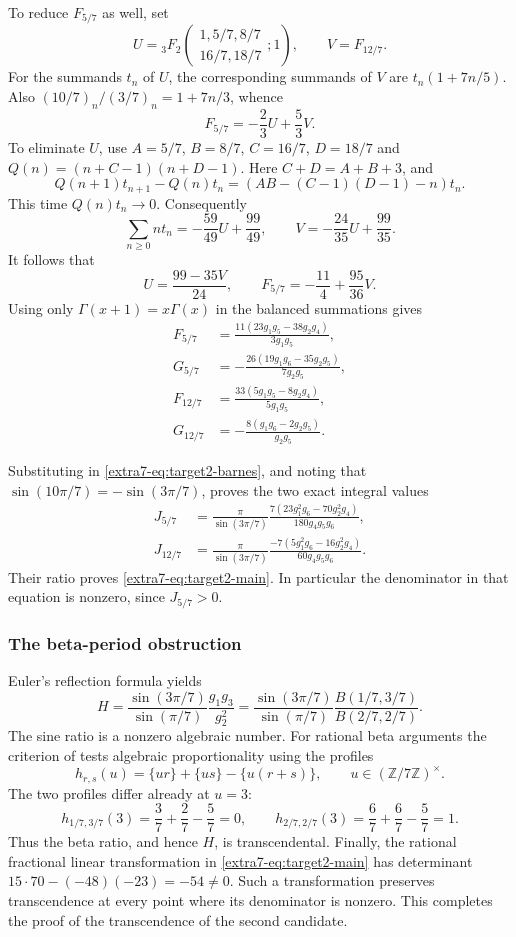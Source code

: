\documentclass[11pt,a4paper]{article}
\theoremstyle{definition}
\theoremstyle{remark}
\numberwithin{equation}{section}
\begin{document}
To reduce $F_{5/7}$ as well, set
\[
 U={}_3F_2\left(
    \begin{matrix}1,5/7,8/7\\16/7,18/7\end{matrix};1\right),
 \qquad V=F_{12/7}.
\]
For the summands $t_n$ of $U$, the corresponding summands of $V$ are
$t_n(1+7n/5)$.  Also
$(10/7)_n/(3/7)_n=1+7n/3$, whence
\[
 F_{5/7}=-\frac23U+\frac53V.
\]
To eliminate $U$, use $A=5/7$, $B=8/7$, $C=16/7$, $D=18/7$ and
$Q(n)=(n+C-1)(n+D-1)$.  Here $C+D=A+B+3$, and
\[
 Q(n+1)t_{n+1}-Q(n)t_n
 =\left(AB-(C-1)(D-1)-n\right)t_n.
\]
This time $Q(n)t_n\longrightarrow0$.  Consequently
\[
 \sum_{n\geq0}nt_n=-\frac{59}{49}U+\frac{99}{49},\qquad
 V=-\frac{24}{35}U+\frac{99}{35}.
\]
It follows that
\[
 U=\frac{99-35V}{24},\qquad
 F_{5/7}=-\frac{11}{4}+\frac{95}{36}V.
\]
Using only $\Gamma(x+1)=x\Gamma(x)$ in the balanced summations gives
\begin{align*}
 F_{5/7}&=\frac{11(23g_1g_5-38g_2g_4)}{3g_1g_5},\\
 G_{5/7}&=-\frac{26(19g_1g_6-35g_2g_5)}{7g_2g_5},\\
 F_{12/7}&=\frac{33(5g_1g_5-8g_2g_4)}{5g_1g_5},\\
 G_{12/7}&=-\frac{8(g_1g_6-2g_2g_5)}{g_2g_5}.
\end{align*}

Substituting in \eqref{extra7-eq:target2-barnes}, and noting that
$\sin(10\pi/7)=-\sin(3\pi/7)$, proves the two exact integral values
\begin{align}
 J_{5/7}&=\frac{\pi}{\sin(3\pi/7)}
   \frac{7(23g_1^2g_6-70g_2^2g_4)}{180g_4g_5g_6},
   \label{extra7-eq:target2-j0}\\
 J_{12/7}&=\frac{\pi}{\sin(3\pi/7)}
   \frac{-7(5g_1^2g_6-16g_2^2g_4)}{60g_4g_5g_6}.
   \label{extra7-eq:target2-j1}
\end{align}
Their ratio proves \eqref{extra7-eq:target2-main}.  In particular the
denominator in that equation is nonzero, since $J_{5/7}>0$.

\subsubsection{The beta-period obstruction}

Euler's reflection formula yields
\[
 H=\frac{\sin(3\pi/7)}{\sin(\pi/7)}
   \frac{g_1g_3}{g_2^2}
  =\frac{\sin(3\pi/7)}{\sin(\pi/7)}
   \frac{B(1/7,3/7)}{B(2/7,2/7)}.
\]
The sine ratio is a nonzero algebraic number.  For rational beta
arguments the criterion of \cite{dbkz-ww} tests algebraic proportionality
using the profiles
\[
 h_{r,s}(u)=\{ur\}+\{us\}-\{u(r+s)\},
 \qquad u\in(\mathbb Z/7\mathbb Z)^\times.
\]
The two profiles differ already at $u=3$:
\[
 h_{1/7,3/7}(3)=\frac37+\frac27-\frac57=0,
 \qquad
 h_{2/7,2/7}(3)=\frac67+\frac67-\frac57=1.
\]
Thus the beta ratio, and hence $H$, is transcendental.  Finally,
the rational fractional linear transformation in
\eqref{extra7-eq:target2-main} has determinant
$15\cdot70-(-48)(-23)=-54\ne0$.  Such a transformation preserves
transcendence at every point where its denominator is nonzero.
This completes the proof of the transcendence of the second candidate.
\end{document}
